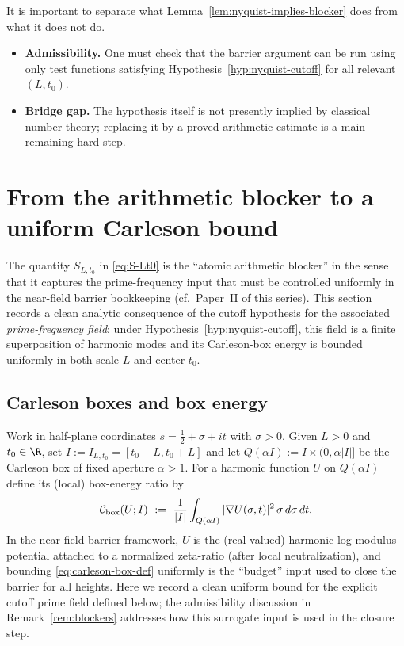 \documentclass[11pt]{article}
\begin{document}
\begin{remark}\label{rem:blockers}
It is important to separate what Lemma~\ref{lem:nyquist-implies-blocker} does from what it does not do.
\begin{itemize}
\item \textbf{Admissibility.} One must check that the barrier argument can be run using only test functions satisfying Hypothesis~\ref{hyp:nyquist-cutoff} for all relevant $(L,t_0)$.
\item \textbf{Bridge gap.} The hypothesis itself is not presently implied by classical number theory; replacing it by a proved arithmetic estimate is a main remaining hard step.
\end{itemize}
\end{remark}

\section{From the arithmetic blocker to a uniform Carleson bound}\label{sec:carleson}

The quantity $S_{L,t_0}$ in \eqref{eq:S-Lt0} is the ``atomic arithmetic blocker'' in the sense that it captures the prime-frequency input that must be controlled uniformly in the near-field barrier bookkeeping (cf.\ Paper~II of this series).
This section records a clean analytic consequence of the cutoff hypothesis for the associated \emph{prime-frequency field}: under Hypothesis~\ref{hyp:nyquist-cutoff}, this field is a finite superposition of harmonic modes and its Carleson-box energy is bounded uniformly in both scale $L$ and center $t_0$.

\subsection*{Carleson boxes and box energy}
Work in half-plane coordinates $s=\tfrac12+\sigma+it$ with $\sigma>0$.
Given $L>0$ and $t_0\in\R$, set $I:=I_{L,t_0}=[t_0-L,t_0+L]$ and let $Q(\alpha I):=I\times(0,\alpha|I|]$ be the Carleson box of fixed aperture $\alpha>1$.
For a harmonic function $U$ on $Q(\alpha I)$ define its (local) box-energy ratio by
\begin{equation}\label{eq:carleson-box-def}
  \mathcal C_{\rm box}(U;I)\ :=\ \frac{1}{|I|}\int_{Q(\alpha I)} |\nabla U(\sigma,t)|^2\,\sigma\,d\sigma\,dt.
\end{equation}
In the near-field barrier framework, $U$ is the (real-valued) harmonic log-modulus potential attached to a normalized zeta-ratio (after local neutralization), and bounding \eqref{eq:carleson-box-def} uniformly is the ``budget'' input used to close the barrier for all heights.
Here we record a clean uniform bound for the explicit cutoff prime field defined below; the admissibility discussion in Remark~\ref{rem:blockers} addresses how this surrogate input is used in the closure step.
\end{document}
